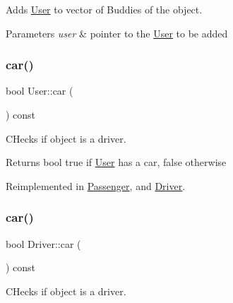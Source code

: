Adds \hyperlink{class_user}{User} to vector of Buddies of the object. 


\begin{DoxyParams}{Parameters}
{\em user} & pointer to the \hyperlink{class_user}{User} to be added \\
\hline
\end{DoxyParams}
\mbox{\label{group___user_ga86635e817828c81ee5e18b2e802e3218}} 
\subsubsection{\texorpdfstring{car()}{car()}\hspace{0.1cm}{\footnotesize\ttfamily [1/3]}}
{\footnotesize\ttfamily bool User\+::car (\begin{DoxyParamCaption}{ }\end{DoxyParamCaption}) const\hspace{0.3cm}{\ttfamily [virtual]}}



C\+Hecks if object is a driver. 

\begin{DoxyReturn}{Returns}
bool true if \hyperlink{class_user}{User} has a car, false otherwise 
\end{DoxyReturn}


Reimplemented in \hyperlink{group___user_gaeb69b29d53079577e41f070da1f442dd}{Passenger}, and \hyperlink{group___user_gaf8b79bce2879830b12e6f3ec954192a2}{Driver}.

\mbox{\label{group___user_gaf8b79bce2879830b12e6f3ec954192a2}} 
\subsubsection{\texorpdfstring{car()}{car()}\hspace{0.1cm}{\footnotesize\ttfamily [2/3]}}
{\footnotesize\ttfamily bool Driver\+::car (\begin{DoxyParamCaption}{ }\end{DoxyParamCaption}) const\hspace{0.3cm}{\ttfamily [virtual]}}



C\+Hecks if object is a driver. 

